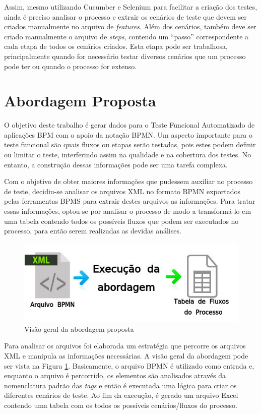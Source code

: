 \documentclass[12pt]{article}
\begin{document}
Assim, mesmo utilizando Cucumber e Selenium para facilitar a criação dos testes, ainda é preciso analisar o processo e extrair os cenários de teste que devem ser criados manualmente no arquivo de \emph{features}. Além dos cenários, também deve ser criado manualmente o arquivo de \emph{steps}, contendo um ``passo'' correspondente a cada etapa de todos os cenários criados. Esta etapa pode ser trabalhosa, principalmente quando for necessário testar diversos cenários que um processo pode ter ou quando o processo for extenso.

\section{Abordagem Proposta}\label{sec:abordagem}
O objetivo deste trabalho é gerar dados para o Teste Funcional Automatizado de aplicações BPM com o apoio da notação BPMN. Um aspecto importante para o teste funcional são quais fluxos ou etapas serão testadas, pois estes podem definir ou limitar o teste, interferindo assim na qualidade e na cobertura dos testes. No entanto, a construção dessas informações pode ser uma tarefa complexa.

Com o objetivo de obter maiores informações que pudessem auxiliar no processo de teste, decidiu-se analisar os arquivos XML no formato BPMN exportados pelas ferramentas BPMS para extrair destes arquivos as informações. Para tratar essas informações, optou-se por analisar o processo de modo a transformá-lo em uma tabela contendo todos os possíveis fluxos que podem ser executados no processo, para então serem realizadas as devidas análises. 

\begin{figure}[ht]
\centering
\includegraphics[width=.8\textwidth]{figuras/abordagem1.png}
\caption{Visão geral da abordagem proposta}
\label{fig:abordagem1}
\end{figure}

Para analisar os arquivos foi elaborada um estratégia que percorre os arquivos XML e manipula as informações necessárias. A visão geral da abordagem pode ser vista na Figura \ref{fig:abordagem1}. Basicamente, o arquivo BPMN é utilizado como entrada e, enquanto o arquivo é percorrido, os elementos são analisados através da nomenclatura padrão das \emph{tags} e então é executada uma lógica para criar os diferentes cenários de teste. Ao fim da execução, é gerado um arquivo Excel contendo uma tabela com os todos os possíveis cenários/fluxos do processo.
\end{document}
